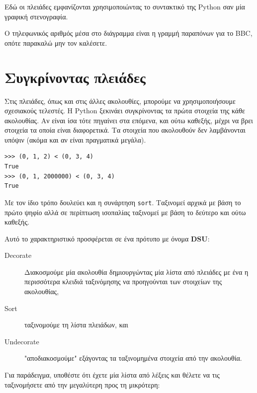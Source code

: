 \documentclass[10pt]{book}
\begin{document}
Εδώ οι πλειάδες εμφανίζονται χρησιμοποιώντας το συντακτικό της Python σαν μία γραφική στενογραφία.

Ο τηλεφωνικός αριθμός μέσα στο διάγραμμα είναι η γραμμή παραπόνων για το BBC, οπότε παρακαλώ μην τον καλέσετε.


\section{Συγκρίνοντας πλειάδες}

Στις πλειάδες, όπως και στις άλλες ακολουθίες, μπορούμε να χρησιμοποιήσουμε σχεσιακούς τελεστές. Η Python ξεκινάει συγκρίνοντας τα πρώτα στοιχεία  της κάθε ακολουθίας. Αν είναι ίσα τότε πηγαίνει στα επόμενα, και ούτω καθεξής, μέχρι να βρει στοιχεία τα οποία είναι διαφορετικά. Τα στοιχεία που ακολουθούν δεν λαμβάνονται υπόψιν (ακόμα και αν είναι πραγματικά μεγάλα).

 
\begin{verbatim}
>>> (0, 1, 2) < (0, 3, 4)
True
>>> (0, 1, 2000000) < (0, 3, 4)
True
\end{verbatim}
%
Με τον ίδιο τρόπο δουλεύει και η συνάρτηση {\tt sort}. Ταξινομεί αρχικά με βάση το πρώτο ψηφίο αλλά σε περίπτωση ισοπαλίας ταξινομεί με βάση το δεύτερο και ούτω καθεξής.

Αυτό το χαρακτηριστικό προσφέρεται σε ένα πρότυπο με όνομα {\bf DSU}:

\begin{description}

\item[Decorate] Διακοσμούμε μία ακολουθία δημιουργώντας μία λίστα από πλειάδες με ένα η περισσότερα κλειδιά ταξινόμησης να προηγούνται των στοιχείων της ακολουθίας, 

\item[Sort] ταξινομούμε τη λίστα πλειάδων, και 

\item[Undecorate] "αποδιακοσμούμε" εξάγοντας τα ταξινομημένα στοιχεία από την ακολουθία. 

\end{description}

\label{DSU}

Για παράδειγμα, υποθέστε ότι έχετε μία λίστα από λέξεις και θέλετε να τις ταξινομήσετε από την μεγαλύτερη προς τη μικρότερη:
\end{document}
